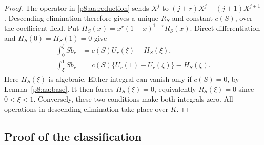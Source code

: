 \documentclass[11pt,a4paper]{article}
\theoremstyle{definition}
\theoremstyle{remark}
\numberwithin{equation}{section}
\begin{document}
\begin{proof}
The operator in \eqref{p8:aa:reduction} sends $X^j$ to
$(j+r)X^j-(j+1)X^{j+1}$. Descending elimination therefore gives
a unique $R_S$ and constant $c(S)$, over the coefficient field.
Put $H_S(x)=x^r(1-x)^{1-r}R_S(x)$. Direct differentiation and
$H_S(0)=H_S(1)=0$ give
\begin{align*}
 \int_0^\xi S b_r&=c(S)U_r(\xi)+H_S(\xi),\\
 \int_\xi^1 S b_r&=c(S)\{U_r(1)-U_r(\xi)\}-H_S(\xi).
\end{align*}
Here $H_S(\xi)$ is algebraic. Either integral can vanish only if
$c(S)=0$, by Lemma~\ref{p8:aa:base}. It then forces
$H_S(\xi)=0$, equivalently $R_S(\xi)=0$ since
$0<\xi<1$. Conversely, these two conditions make both integrals
zero. All operations in descending elimination take place over $K$.
\end{proof}

\subsection{Proof of the classification}
\end{document}
